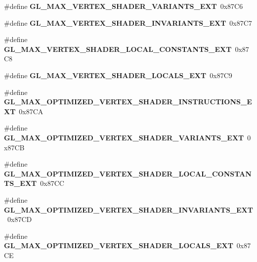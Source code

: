 \begin{DoxyCompactItemize}
\item 
\#define {\bfseries G\+L\+\_\+\+M\+A\+X\+\_\+\+V\+E\+R\+T\+E\+X\+\_\+\+S\+H\+A\+D\+E\+R\+\_\+\+V\+A\+R\+I\+A\+N\+T\+S\+\_\+\+E\+X\+T}~0x87\+C6\label{_s_d_l__opengl_8h_aa684d6ee65d6600468c46ff831b3e6c8}

\item 
\#define {\bfseries G\+L\+\_\+\+M\+A\+X\+\_\+\+V\+E\+R\+T\+E\+X\+\_\+\+S\+H\+A\+D\+E\+R\+\_\+\+I\+N\+V\+A\+R\+I\+A\+N\+T\+S\+\_\+\+E\+X\+T}~0x87\+C7\label{_s_d_l__opengl_8h_ac3bf1b923287b0f791c80e5eb9f9f6f2}

\item 
\#define {\bfseries G\+L\+\_\+\+M\+A\+X\+\_\+\+V\+E\+R\+T\+E\+X\+\_\+\+S\+H\+A\+D\+E\+R\+\_\+\+L\+O\+C\+A\+L\+\_\+\+C\+O\+N\+S\+T\+A\+N\+T\+S\+\_\+\+E\+X\+T}~0x87\+C8\label{_s_d_l__opengl_8h_a30deb8b7d2d5939fe8b5e1160d280027}

\item 
\#define {\bfseries G\+L\+\_\+\+M\+A\+X\+\_\+\+V\+E\+R\+T\+E\+X\+\_\+\+S\+H\+A\+D\+E\+R\+\_\+\+L\+O\+C\+A\+L\+S\+\_\+\+E\+X\+T}~0x87\+C9\label{_s_d_l__opengl_8h_a65ee2f939bf5d47edc55c7da35dbf167}

\item 
\#define {\bfseries G\+L\+\_\+\+M\+A\+X\+\_\+\+O\+P\+T\+I\+M\+I\+Z\+E\+D\+\_\+\+V\+E\+R\+T\+E\+X\+\_\+\+S\+H\+A\+D\+E\+R\+\_\+\+I\+N\+S\+T\+R\+U\+C\+T\+I\+O\+N\+S\+\_\+\+E\+X\+T}~0x87\+C\+A\label{_s_d_l__opengl_8h_a8c2f729f1c891b520b9240d360a9cc35}

\item 
\#define {\bfseries G\+L\+\_\+\+M\+A\+X\+\_\+\+O\+P\+T\+I\+M\+I\+Z\+E\+D\+\_\+\+V\+E\+R\+T\+E\+X\+\_\+\+S\+H\+A\+D\+E\+R\+\_\+\+V\+A\+R\+I\+A\+N\+T\+S\+\_\+\+E\+X\+T}~0x87\+C\+B\label{_s_d_l__opengl_8h_a89298280d2f8d7f537f573c27ef3dce8}

\item 
\#define {\bfseries G\+L\+\_\+\+M\+A\+X\+\_\+\+O\+P\+T\+I\+M\+I\+Z\+E\+D\+\_\+\+V\+E\+R\+T\+E\+X\+\_\+\+S\+H\+A\+D\+E\+R\+\_\+\+L\+O\+C\+A\+L\+\_\+\+C\+O\+N\+S\+T\+A\+N\+T\+S\+\_\+\+E\+X\+T}~0x87\+C\+C\label{_s_d_l__opengl_8h_ac89ce8c69a96bf2695806fa0e4fc7d2c}

\item 
\#define {\bfseries G\+L\+\_\+\+M\+A\+X\+\_\+\+O\+P\+T\+I\+M\+I\+Z\+E\+D\+\_\+\+V\+E\+R\+T\+E\+X\+\_\+\+S\+H\+A\+D\+E\+R\+\_\+\+I\+N\+V\+A\+R\+I\+A\+N\+T\+S\+\_\+\+E\+X\+T}~0x87\+C\+D\label{_s_d_l__opengl_8h_a4009460449fb2df6b87e02795e804e23}

\item 
\#define {\bfseries G\+L\+\_\+\+M\+A\+X\+\_\+\+O\+P\+T\+I\+M\+I\+Z\+E\+D\+\_\+\+V\+E\+R\+T\+E\+X\+\_\+\+S\+H\+A\+D\+E\+R\+\_\+\+L\+O\+C\+A\+L\+S\+\_\+\+E\+X\+T}~0x87\+C\+E\label{_s_d_l__opengl_8h_a892527003835bfba147a2753a1418e1c}


\end{DoxyCompactItemize}
